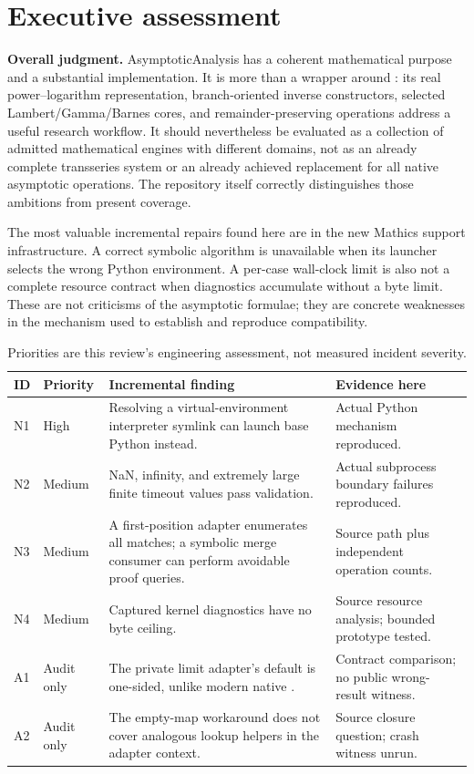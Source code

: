 \documentclass[11pt,letterpaper]{article}
\newcommand{\code}[1]{\texttt{\detokenize{#1}}}
\begin{document}
\section{Executive assessment}

\textbf{Overall judgment.} AsymptoticAnalysis has a coherent mathematical purpose and a substantial implementation. It is more than a wrapper around \code{Series}: its real power--logarithm representation, branch-oriented inverse constructors, selected Lambert/Gamma/Barnes cores, and remainder-preserving operations address a useful research workflow. It should nevertheless be evaluated as a collection of admitted mathematical engines with different domains, not as an already complete transseries system or an already achieved replacement for all native asymptotic operations. The repository itself correctly distinguishes those ambitions from present coverage.~\cite{readme,kernelmap}

The most valuable incremental repairs found here are in the new Mathics support infrastructure. A correct symbolic algorithm is unavailable when its launcher selects the wrong Python environment. A per-case wall-clock limit is also not a complete resource contract when diagnostics accumulate without a byte limit. These are not criticisms of the asymptotic formulae; they are concrete weaknesses in the mechanism used to establish and reproduce compatibility.

\begin{table}[ht]
\centering\small
\begin{tabularx}{\textwidth}{@{}P{0.48in}P{1.06in}YP{1.4in}@{}}
\toprule
ID & Priority & Incremental finding & Evidence here \\
\midrule
N1 & High & Resolving a virtual-environment interpreter symlink can launch base Python instead. & Actual Python mechanism reproduced. \\
N2 & Medium & NaN, infinity, and extremely large finite timeout values pass validation. & Actual subprocess boundary failures reproduced. \\
N3 & Medium & A first-position adapter enumerates all matches; a symbolic merge consumer can perform avoidable proof queries. & Source path plus independent operation counts. \\
N4 & Medium & Captured kernel diagnostics have no byte ceiling. & Source resource analysis; bounded prototype tested. \\
A1 & Audit only & The private limit adapter's default is one-sided, unlike modern native \code{Limit}. & Contract comparison; no public wrong-result witness. \\
A2 & Audit only & The empty-map workaround does not cover analogous lookup helpers in the adapter context. & Source closure question; crash witness unrun. \\
\bottomrule
\end{tabularx}
\caption{Priorities are this review's engineering assessment, not measured incident severity.}
\label{tab:findings}
\end{table}
\end{document}
